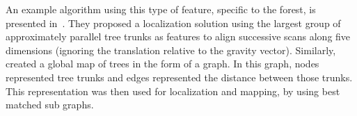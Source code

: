 An example algorithm using this type of feature, specific to the forest, is presented in~\citet{Song2012}. They proposed a localization solution using the largest group of approximately parallel tree trunks as features to align successive scans along five dimensions (ignoring the translation relative to the gravity vector). Similarly, \citet{Miettinen2007} created a global map of trees in the form of a graph. In this graph, nodes represented tree trunks and edges represented the distance between those trunks. This representation was then used for localization and mapping, by using best matched sub graphs.

